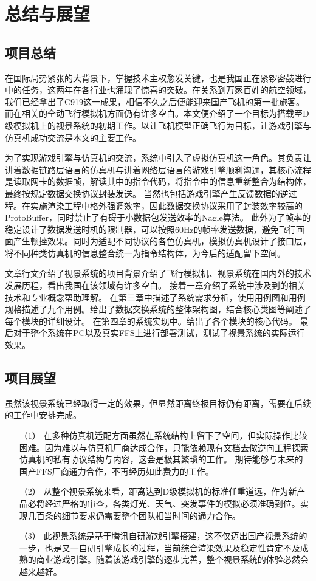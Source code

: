 \chapter{总结与展望}
\section{项目总结}
在国际局势紧张的大背景下，掌握技术主权愈发关键，也是我国正在紧锣密鼓进行中的任务，这两年在各行业也涌现了惊喜的突破。在关系到万家百姓的航空领域，我们已经拿出了C919这一成果，相信不久之后便能迎来国产飞机的第一批旅客。
而在相关的全动飞行模拟机方面仍有许多空白。本文便介绍了一个目标为搭载至D级模拟机上的视景系统的初期工作。以让飞机模型正确飞行为目标，让游戏引擎与仿真机成功交流是本文的主要工作。
\par
为了实现游戏引擎与仿真机的交流，系统中引入了虚拟仿真机这一角色。其负责让讲着数据链路层语言的仿真机与讲着网络层语言的游戏引擎顺利沟通，其核心流程是读取网卡的数据帧，解读其中的指令代码，将指令中的信息重新整合为结构体，最终按规定数据交换协议封装发送。
当然也包括游戏引擎产生反馈数据的逆过程。在实施渲染工程中格外强调效率，因此数据交换协议采用了封装效率较高的ProtoBuffer，同时禁止了有碍于小数据包发送效率的Nagle算法。
此外为了帧率的稳定设计了数据发送时机的限制器，可以按照60Hz的帧率发送数据，避免飞行画面产生顿挫效果。同时为适配不同协议的各色仿真机，模拟仿真机设计了接口层，将不同种类仿真机的信息整合统一为指令结构体，为今后的适配留下空间。
\par
文章行文介绍了视景系统的项目背景介绍了飞行模拟机、视景系统在国内外的技术发展历程，看出我国在该领域有许多空白。
接着一章介绍了系统中涉及到的相关技术和专业概念帮助理解。
在第三章中描述了系统需求分析，使用用例图和用例规格描述了九个用例。给出了数据交换系统的整体架构图，结合核心类图等阐述了每个模块的详细设计。
在第四章的系统实现中。给出了各个模块的核心代码。
最后对于整个系统在PC以及真实FFS上进行部署测试，测试了视景系统的实际运行效果。
\section{项目展望}
虽然该视景系统已经取得一定的效果，但显然距离终极目标仍有距离，需要在后续的工作中安排完成。
\begin{itemize}
    \item [（1）]
    在多种仿真机适配方面虽然在系统结构上留下了空间，但实际操作比较困难。因为难以与仿真机厂商达成合作，只能依赖现有文档去做逆向工程探索仿真机的私有协议结构与内容，这会是极其繁琐的工作。
    期待能够与未来的国产FFS厂商通力合作，不再经历如此费力的工作。
    \item [（2）]
    从整个视景系统来看，距离达到D级模拟机的标准任重道远，作为新产品必将经过严格的审查，各类灯光、天气、突发事件的模拟必须准确到位。实现几百条的细节要求仍需要整个团队相当时间的通力合作。
    \item [（3）]
    此视景系统是基于腾讯自研游戏引擎搭建，这不仅迈出国产视景系统的一步，也是又一自研引擎成长的过程，当前综合渲染效果及稳定性肯定不及成熟的商业游戏引擎。随着该游戏引擎的逐步完善，整个视景系统的体验必然会越来越好。
    
\end{itemize}
